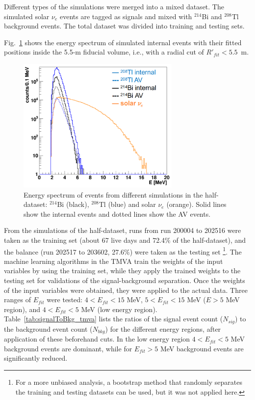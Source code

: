 Different types of the simulations were merged into a mixed dataset. The simulated solar $\nu_e$ events are tagged as signals and mixed with $^{214}$Bi and $^{208}$Tl background events. The total dataset was divided into training and testing sets. 

Fig.~\ref{TMVA_bkgs_1} shows the energy spectrum of simulated internal events with their fitted positions inside the 5.5-m fiducial volume, i.e., with a radial cut of $R'_{fit}<5.5$~m.

\begin{figure}[!htb]
	\centering
	\includegraphics[width=8cm]{TMVA_bkgs_1.png}
	\caption[Energy spectrum of events from different simulations.]{Energy spectrum of events from different simulations in the half-dataset: $^{214}$Bi (black), $^{208}$Tl (blue) and solar $\nu_e$ (orange). Solid lines show the internal events and dotted lines show the AV events.	\label{TMVA_bkgs_1}}

\end{figure}

From the simulations of the half-dataset, runs from run 200004 to 202516 were taken as the training set (about 67 live days and 72.4\% of the half-dataset), and the balance (run 202517 to 203602, 27.6\%) were taken as the testing set \footnote{For a more unbiased analysis, a bootstrap method \cite{murphy2012machine} that randomly separates the training and testing datasets can be used, but it was not applied here.}. The machine learning algorithms in the TMVA train the weights of the input variables by using the training set, while they apply the trained weights to the testing set for validations of the signal-background separation. Once the weights of the input variables were obtained, they were applied to the actual data. Three ranges of $E_{fit}$ were tested: $4<E_{fit}<15$ MeV, $5<E_{fit}<15$ MeV ($E>5$ MeV region), and $4<E_{fit}<5$ MeV (low energy region). Table~\ref{tab:signalToBkg_tmva} lists the ratios of the signal event count ($N_{sig}$) to the background event count ($N_{bkg}$) for the different energy regions, after application of these beforehand cuts. In the low energy region $4<E_{fit}<5$ MeV background events are dominant, while for  $E_{fit}>5$ MeV background events are significantly reduced.

